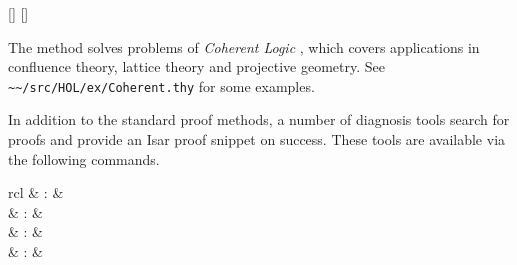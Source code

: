\begin{isabellebody}
\begin{isamarkuptext}
  \begin{railoutput}
[]
\rail@bar
{}
[]
\rail@endbar
\rail@end
\end{railoutput}


  The \hyperlink{method.HOL.coherent}{\mbox{}} method solves problems of
  \emph{Coherent Logic} \cite{Bezem-Coquand:2005}, which covers
  applications in confluence theory, lattice theory and projective
  geometry.  See \verb|~~/src/HOL/ex/Coherent.thy| for some
  examples.%
\end{isamarkuptext}%
\isamarkuptrue%
%
\isamarkuptrue%
%
\begin{isamarkuptext}%
In addition to the standard proof methods, a number of diagnosis
  tools search for proofs and provide an Isar proof snippet on success.
  These tools are available via the following commands.

  \begin{matharray}{rcl}
    \hypertarget{command.HOL.solve-direct}{\hyperlink{command.HOL.solve-direct}{\mbox{}}} & : &  \\
    \hypertarget{command.HOL.try}{\hyperlink{command.HOL.try}{\mbox{}}} & : &  \\
    \hypertarget{command.HOL.sledgehammer}{\hyperlink{command.HOL.sledgehammer}{\mbox{}}} & : &  \\
    \hypertarget{command.HOL.sledgehammer-params}{\hyperlink{command.HOL.sledgehammer-params}{\mbox{}}} & : & 
  \end{matharray}


\end{isamarkuptext}
\end{isabellebody}
